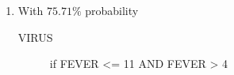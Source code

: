 \documentclass[11pt]{article}
\begin{document}
\begin{enumerate}
    \item With $75.71\%$ probability
        \begin{description}
            \item[VIRUS] if FEVER <= 11 AND FEVER > 4
        \end{description}
\end{enumerate}





% 

% 
% 
\end{document}
